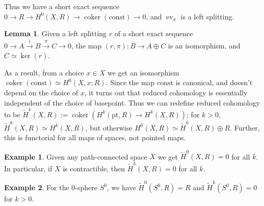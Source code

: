 \documentclass{tufte-handout}
\def\pt {\mathrm{pt}}
\DeclareMathOperator{\coker}{coker}
\DeclareMathOperator{\ev}{ev}
\theoremstyle{definition}
\newtheorem{lemma}{Lemma}
\newtheorem{example}{Example}
\begin{document}
Thus we have a short exact sequence $0 \to R\to H^0(X,R) \to \coker(\mathrm{const}) \to 0$, and $\ev_x$ is a left splitting.

\begin{lemma}
Given a left splitting $r$ of a short exact sequence $0\to A \xrightarrow{i} B \xrightarrow{\pi} 
C \to 0$, the map $(r,\pi)\colon B\to A\oplus C$ is an isomorphism, and $C \simeq \ker(r)$.
\end{lemma}
 
As a result, from a choice $x\in X$ we get an isomorphism $\coker(\mathrm{const})\simeq H^0(X,x;R)$. Since the map $\mathrm{const}$ is canonical, and doesn't depend on the choice of $x$, it turns out that reduced cohomology is essentially independent of the choice of basepoint. Thus we can redefine reduced cohomology to be $\widetilde{H}^k(X,R) := \coker(H^k(\pt,R) \to H^k(X,R))$; for $k>0$, $\widetilde{H}^k(X,R)\simeq H^k(X,R)$, but otherwise $H^0(X,R) \simeq \widetilde{H}^0(X,R) \oplus R$. Further, this is functorial for all maps of spaces, not pointed maps.

\begin{example}
Given any path-connected space $X$ we get $\widetilde{H}^0(X,R) = 0$ for all $k$. In particular, if $X$ is contractible, then $\widetilde{H}^k(X,R) = 0$ for all $k$.
\end{example}

\begin{example}\label{eg:reduced_cohom_S0}
For the $0$-sphere $S^0$, we have $\widetilde{H}^0(S^0,R) = R$ and $\widetilde{H}^k(S^0,R) = 0$ for $k > 0$.
\end{example}
\end{document}
